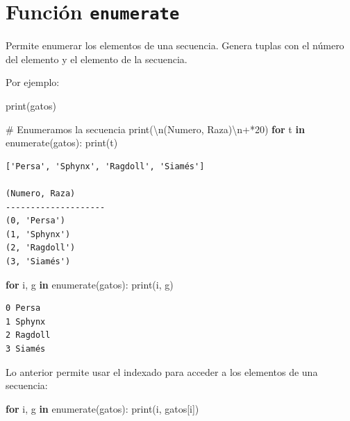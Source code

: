 \documentclass[
  spanish,
  letterpaper,
]{scrbook}
\newenvironment{Shaded}{\begin{snugshade}}{\end{snugshade}}
\newcommand{\BuiltInTok}[1]{\textcolor[rgb]{0.00,0.23,0.31}{#1}}
\newcommand{\CharTok}[1]{\textcolor[rgb]{0.13,0.47,0.30}{#1}}
\newcommand{\CommentTok}[1]{\textcolor[rgb]{0.37,0.37,0.37}{#1}}
\newcommand{\ControlFlowTok}[1]{\textcolor[rgb]{0.00,0.23,0.31}{\textbf{#1}}}
\newcommand{\DecValTok}[1]{\textcolor[rgb]{0.68,0.00,0.00}{#1}}
\newcommand{\KeywordTok}[1]{\textcolor[rgb]{0.00,0.23,0.31}{\textbf{#1}}}
\newcommand{\NormalTok}[1]{\textcolor[rgb]{0.00,0.23,0.31}{#1}}
\newcommand{\OperatorTok}[1]{\textcolor[rgb]{0.37,0.37,0.37}{#1}}
\newcommand{\StringTok}[1]{\textcolor[rgb]{0.13,0.47,0.30}{#1}}
\theoremstyle{definition}
\theoremstyle{remark}
\begin{document}
\section{\texorpdfstring{Función
\texttt{enumerate}}{Función enumerate}}\label{funciuxf3n-enumerate}

Permite enumerar los elementos de una secuencia. Genera tuplas con el
número del elemento y el elemento de la secuencia.

Por ejemplo:

\begin{Shaded}
\begin{Highlighting}[]
\BuiltInTok{print}\NormalTok{(gatos)}

\CommentTok{\# Enumeramos la secuencia}
\BuiltInTok{print}\NormalTok{(}\StringTok{\textquotesingle{}}\CharTok{\textbackslash{}n}\StringTok{(Numero, Raza)}\CharTok{\textbackslash{}n}\StringTok{\textquotesingle{}}\OperatorTok{+}\StringTok{\textquotesingle{}{-}\textquotesingle{}}\OperatorTok{*}\DecValTok{20}\NormalTok{)}
\ControlFlowTok{for}\NormalTok{ t }\KeywordTok{in} \BuiltInTok{enumerate}\NormalTok{(gatos):}
    \BuiltInTok{print}\NormalTok{(t)}
\end{Highlighting}
\end{Shaded}

\begin{verbatim}
['Persa', 'Sphynx', 'Ragdoll', 'Siamés']

(Numero, Raza)
--------------------
(0, 'Persa')
(1, 'Sphynx')
(2, 'Ragdoll')
(3, 'Siamés')
\end{verbatim}

\begin{Shaded}
\begin{Highlighting}[]
\ControlFlowTok{for}\NormalTok{ i, g }\KeywordTok{in} \BuiltInTok{enumerate}\NormalTok{(gatos):}
    \BuiltInTok{print}\NormalTok{(i, g)}
\end{Highlighting}
\end{Shaded}

\begin{verbatim}
0 Persa
1 Sphynx
2 Ragdoll
3 Siamés
\end{verbatim}

Lo anterior permite usar el indexado para acceder a los elementos de una
secuencia:

\begin{Shaded}
\begin{Highlighting}[]
\ControlFlowTok{for}\NormalTok{ i, g }\KeywordTok{in} \BuiltInTok{enumerate}\NormalTok{(gatos):}
    \BuiltInTok{print}\NormalTok{(i, gatos[i])}
\end{Highlighting}
\end{Shaded}
\end{document}
